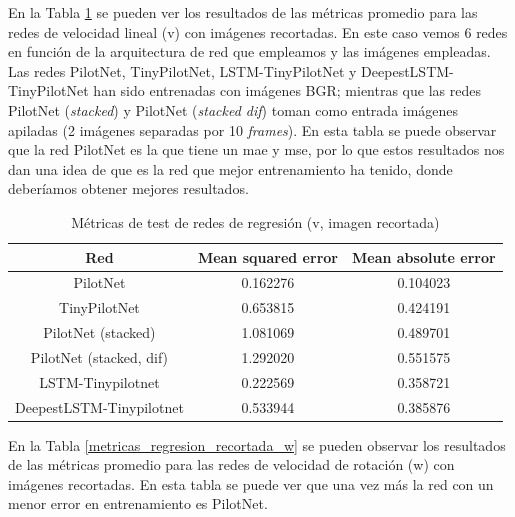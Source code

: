 En la Tabla \ref{metricas_regresion_recortada_v} se pueden ver los resultados de las métricas promedio para las redes de velocidad lineal (v) con imágenes recortadas. En este caso vemos 6 redes en función de la arquitectura de red que empleamos y las imágenes empleadas. Las redes PilotNet, TinyPilotNet, LSTM-TinyPilotNet y DeepestLSTM-TinyPilotNet han sido entrenadas con imágenes BGR; mientras que las redes PilotNet (\textit{stacked}) y PilotNet (\textit{stacked dif}) toman como entrada imágenes apiladas (2 imágenes separadas por 10 \textit{frames}). En esta tabla se puede observar que la red PilotNet es la que tiene un \acrshort{mae} y \acrshort{mse}, por lo que estos resultados nos dan una idea de que es la red que mejor entrenamiento ha tenido, donde deberíamos obtener mejores resultados.\\

\begin{table}[H]
\centering
\caption{Métricas de test de redes de regresión (v, imagen recortada)}
\label{metricas_regresion_recortada_v}
\begin{tabular}{c|c|c|}
\cline{1-3}
                        \multicolumn{1}{|c|}{Red}    & Mean squared error       & Mean absolute error             \\ \hline
\multicolumn{1}{|c|}{PilotNet}    & 0.162276   & 0.104023   \\ \hline
\multicolumn{1}{|c|}{TinyPilotNet}     & 0.653815      & 0.424191   \\ \hline
\multicolumn{1}{|c|}{PilotNet (stacked)}   & 1.081069    & 0.489701   \\ \hline
\multicolumn{1}{|c|}{PilotNet (stacked, dif)}     & 1.292020    & 0.551575        \\ \hline
\multicolumn{1}{|c|}{LSTM-Tinypilotnet}     & 0.222569   & 0.358721        \\ \hline
\multicolumn{1}{|c|}{DeepestLSTM-Tinypilotnet}     & 0.533944   & 0.385876        \\ \hline
\end{tabular}
\end{table}


En la Tabla \ref{metricas_regresion_recortada_w} se pueden observar los resultados de las métricas promedio para las redes de velocidad de rotación (w) con imágenes recortadas. En esta tabla se puede ver que una vez más la red con un menor error en entrenamiento es PilotNet.\\

